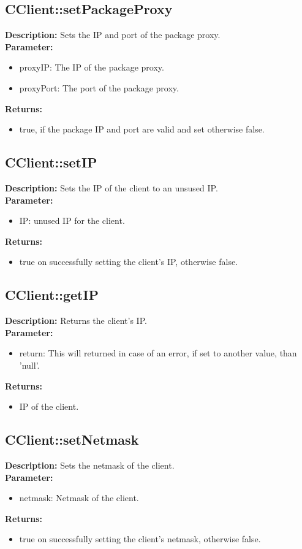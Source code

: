 \subsection{CClient::setPackageProxy}
\textbf{Description:} Sets the IP and port of the package proxy.\\
\textbf{Parameter:}
\begin{itemize}
\item proxyIP: The IP of the package proxy.
\item proxyPort: The port of the package proxy.
\end{itemize}
\textbf{Returns:}
\begin{itemize}
\item true, if the package IP and port are valid and set otherwise false.
\end{itemize}

\subsection{CClient::setIP}
\textbf{Description:} Sets the IP of the client to an unsused IP.\\
\textbf{Parameter:}
\begin{itemize}
\item IP: unused IP for the client.
\end{itemize}
\textbf{Returns:}
\begin{itemize}
\item true on successfully setting the client's IP, otherwise false.
\end{itemize}

\subsection{CClient::getIP}
\textbf{Description:} Returns the client's IP.\\
\textbf{Parameter:}
\begin{itemize}
\item return: This will returned in case of an error, if set to another value, than 'null'.
\end{itemize}
\textbf{Returns:}
\begin{itemize}
\item IP of the client.
\end{itemize}

\subsection{CClient::setNetmask}
\textbf{Description:} Sets the netmask of the client.\\
\textbf{Parameter:}
\begin{itemize}
\item netmask: Netmask of the client.
\end{itemize}
\textbf{Returns:}
\begin{itemize}
\item true on successfully setting the client's netmask, otherwise false.
\end{itemize}

